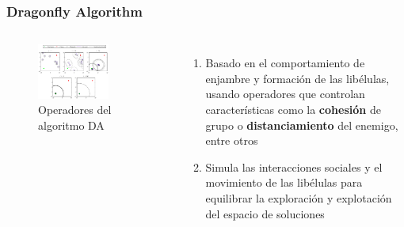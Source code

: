 \begin{frame}
  \frametitle{Dragonfly Algorithm}
  \begin{columns}
    \begin{figure}
      \begin{center}
        \includegraphics[width=0.7\textwidth]{imagenes/chapter3/da-operators.png}
      \end{center}
      \caption{Operadores del algoritmo DA \footnotemark[10]}
    \end{figure}
    \begin{enumerate}
      \item Basado en el comportamiento de enjambre y formación de las libélulas, usando operadores que controlan características como la \textbf{cohesión} de grupo o \textbf{distanciamiento} del enemigo, entre otros
      \item Simula las interacciones sociales y el movimiento de las libélulas para equilibrar la exploración y explotación del espacio de soluciones
    \end{enumerate}
  \end{columns}
\end{frame}

